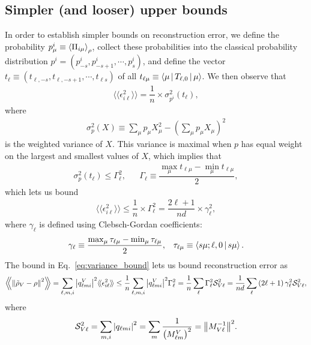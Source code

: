 \documentclass[notitlepage,twocolumn]{revtex4-2}
\newcommand{\f}[2]{\dfrac{#1}{#2}} %
\newcommand{\p}[1]{\left(#1\right)} %
\newcommand{\bk}{\Braket} %
\newcommand{\bbk}[1]{\langle\!\langle #1 \rangle\!\rangle}
\newcommand{\Bbk}[1]
{\left\langle\!\!\left\langle #1 \right\rangle\!\!\right\rangle}
\renewcommand{\S}{\mathcal{S}}
\begin{document}
\subsection{Simpler (and looser) upper bounds}

In order to establish simpler bounds on reconstruction error, we define the probability $p^i_\mu\equiv\bk{\Pi_{i\mu}}_\rho$, collect these probabilities into the classical probability distribution $p^i = \p{p^i_{-s}, p^i_{-s+1}, \cdots, p^i_s}$, and define the vector $t_\ell \equiv \p{t_{\ell,-s},t_{\ell,-s+1},\cdots,t_{\ell s}}$ of all $t_{\ell\mu}\equiv\bk{\mu|T_{\ell,0}|\mu}$.
We then observe that
\begin{align}
  \bbk{\epsilon_{i\ell}^2} = \f1n \times \sigma_{p^i}^2\p{t_\ell},
\end{align}
where
\begin{align}
  \sigma_p^2\p{X}
  \equiv \sum_\mu p_\mu X_\mu^2 - \p{\sum_\mu p_\mu X_\mu}^2
\end{align}
is the weighted variance of $X$.
This variance is maximal when $p$ has equal weight on the largest and smallest values of $X$, which implies that
\begin{align}
  \sigma_p^2\p{t_\ell} \le \Gamma_\ell^2,
  &&
  \Gamma_\ell \equiv \f{\max_\mu t_{\ell\mu} - \min_\mu t_{\ell\mu}}{2},
\end{align}
which lets us bound
\begin{align}
  \bbk{\epsilon_{i\ell}^2}
  \le \f1n \times \Gamma_\ell^2
  = \f{2\ell+1}{nd} \times \gamma_\ell^2,
  \label{eq:variance_bound}
\end{align}
where $\gamma_\ell$ is defined using Clebsch-Gordan coefficients:
\begin{align}
  \gamma_\ell \equiv \f{\max_\mu\tau_{\ell\mu} - \min_\mu\tau_{\ell\mu}}{2},
  &&
  \tau_{\ell\mu} \equiv \bk{s\mu;\ell,0|s\mu}.
\end{align}
The bound in Eq.~\eqref{eq:variance_bound} lets us bound reconstruction error as
\begin{align}
  \Bbk{\norm{\tilde\rho_V-\rho}^2}
  = \sum_{\ell,m,i} \abs{q^V_{\ell mi}}^2 \bbk{\epsilon_{i\ell}^2}
  \le \f1n \sum_{\ell,m,i} \abs{q^V_{\ell mi}}^2 \Gamma_\ell^2
  = \f1n \sum_\ell \Gamma_\ell^2 \S_{V\ell}^2
  = \f1{nd} \sum_\ell \p{2\ell+1} \gamma_\ell^2 \S_{V\ell}^2,
\end{align}
where
\begin{align}
  \S_{V\ell}^2 = \sum_{m,i} \abs{q_{\ell mi}}^2
  = \sum_m \f1{\p{M^V_{\ell m}}^2}
  = \norm{M_{V\ell}^{-1}}^2.
\end{align}
\end{document}
